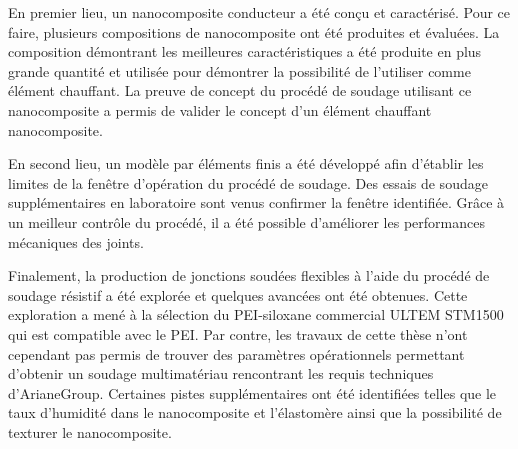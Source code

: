 %

En premier lieu, un nanocomposite conducteur a été conçu et caractérisé. 
Pour ce faire, plusieurs compositions de nanocomposite ont été produites et évaluées. 
La composition démontrant les meilleures caractéristiques a été produite en plus grande quantité et utilisée pour démontrer la possibilité de l'utiliser comme élément chauffant. 
La preuve de concept du procédé de soudage utilisant ce nanocomposite a permis de valider le concept d'un élément chauffant nanocomposite. 

En second lieu, un modèle par éléments finis a été développé afin d'établir les limites de la fenêtre d'opération du procédé de soudage. 
Des essais de soudage supplémentaires en laboratoire sont venus confirmer la fenêtre identifiée. 
Grâce à un meilleur contrôle du procédé, il a été possible d'améliorer les performances mécaniques des joints. 

Finalement, la production de jonctions soudées flexibles à l'aide du procédé de soudage résistif a été explorée et quelques avancées ont été obtenues. 
Cette exploration a mené à la sélection du PEI-siloxane commercial ULTEM STM1500 qui est compatible avec le PEI. 
Par contre, les travaux de cette thèse n'ont cependant pas permis de trouver des paramètres opérationnels permettant d'obtenir un soudage multimatériau rencontrant les requis techniques d'ArianeGroup. 
Certaines pistes supplémentaires ont été identifiées telles que le taux d'humidité dans le nanocomposite et l'élastomère ainsi que la possibilité de texturer le nanocomposite. 

